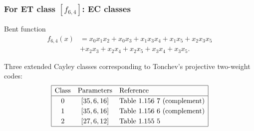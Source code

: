 \documentclass[pdf,sprung,slideColor,nocolorBG]{beamer}
\newenvironment{colortheme}[1]{
\def\ProvidesPackageRCS $##1${\relax}
\renewcommand{\ProcessOptions}{\relax}
\makeatletter

\makeatother
}{}
\begin{document}
\begin{colortheme}{jubata}
\begin{frame}
\begin{figure}
\begin{minipage}{.48\textwidth}
  \label{fig:6_3_bent_cayley_graph_index_matrix}
\end{minipage}
\end{figure}
\end{frame}
\begin{frame}
\frametitle{For ET class $[f_{6,4}]$: EC classes}

Bent function
\begin{align*}
f_{6,4}(x) &= x_{0} x_{1} x_{2} + x_{0} x_{3} + x_{1} x_{3} x_{4} + x_{1} x_{5} + x_{2} x_{3} x_{5}
\\
           &+ x_{2} x_{3} + x_{2} x_{4} + x_{2} x_{5} + x_{3} x_{4} + x_{3} x_{5}.
\end{align*}

Three extended Cayley classes corresponding to Tonchev's projective two-weight codes:
\begin{align*}
\def\arraystretch{1.2}
\begin{array}{|ccl|}
\hline
\text{Class} &
\text{Parameters} & \text{Reference}
\\
\hline
0 & [35,6,16] & \text{Table 1.156 7 (complement)}
\\
1 & [35,6,16] & \text{Table 1.156 6 (complement)}
\\
2 & [27,6,12] & \text{Table 1.155 5 }
\\
\hline
\end{array}
\end{align*}


\end{frame}
\end{colortheme}
\end{document}
